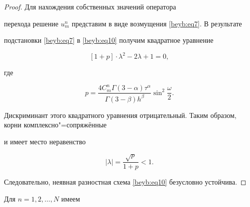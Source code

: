 \begin{proof}

Для нахождения собственных значений оператора

перехода решение $u_m^n$ представим в виде возмущения \eqref{beyb:eq7}. В результате

подстановки \eqref{beyb:eq7} в \eqref{beyb:eq10} получим квадратное уравнение

\[

[1+p]\cdot \lambda^2-2\lambda +1=0,

\]

где

$$

p=\frac{4C_m^n \Gamma (3-\alpha )\tau ^\alpha }{\Gamma (3-\beta

)h^\beta }\sin ^2\frac{\omega }{2}.

$$



Дискриминант этого квадратного уравнения отрицательный. Таким образом, корни комплексно"=сопряжённые

и имеет место неравенство

\[

|\lambda |=\frac{\sqrt p }{1+p}<1.

\]



Следовательно, неявная разностная схема \eqref{beyb:eq10} безусловно устойчива.

\end{proof}



\smallskip



Для $n =1, 2, \dots, N$ имеем

